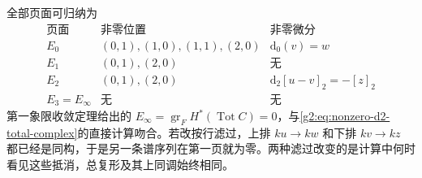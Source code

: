 全部页面可归纳为
\[
	\begin{array}{c|c|c}
		\text{页面}&\text{非零位置}&\text{非零微分}\\ \hline
		E_0&(0,1),(1,0),(1,1),(2,0)&\mathrm d_0(v)=w\\
		E_1&(0,1),(2,0)&\text{无}\\
		E_2&(0,1),(2,0)&\mathrm d_2[u-v]_2=-[z]_2\\
		E_3=E_\infty&\text{无}&\text{无}
	\end{array}
\]
第一象限收敛定理给出的 \(E_\infty=\operatorname{gr}_F H^*(\operatorname{Tot}C)=0\)，与\eqref{g2:eq:nonzero-d2-total-complex}的直接计算吻合。若改按行滤过，上排 \(ku\to kw\) 和下排 \(kv\to kz\) 都已经是同构，于是另一条谱序列在第一页就为零。两种滤过改变的是计算中何时看见这些抵消，总复形及其上同调始终相同。

